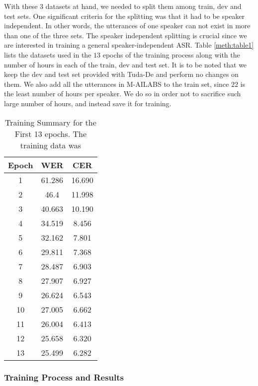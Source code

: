 With these $3$ datasets at hand, we needed to split them among train, dev and test sets. One significant criteria for the splitting was that it had to be speaker independent. In other words, the utterances of one speaker can not exist in more than one of the three sets. The speaker independent splitting is crucial since we are interested in training a general speaker-independent \ac{ASR}. Table \ref{meth:table1} lists the datasets used in the $13$ epochs of the training process along with the number of hours in each of the train, dev and test set. It is to be noted that we keep the dev and test set provided with Tuda-De and perform no changes on them. We also add all the utterances in M-AILABS to the train set, since $22$ is the least number of hours per speaker. We do so in order not to sacrifice such large number of hours, and instead save it for training.

\begin{table}[!ht]
	\centering
	\begin{tabular}{|c|c|c|}
		\hline
		Epoch & WER    & CER    \\ \hline
		1     & 61.286 & 16.690 \\ \hline
		2     & 46.4 & 11.998 \\ \hline
		3     & 40.663 & 10.190 \\ \hline
		4     & 34.519 & 8.456  \\ \hline
		5     & 32.162 & 7.801  \\ \hline
		6     & 29.811 & 7.368  \\ \hline
		7     & 28.487 & 6.903  \\ \hline
		8     & 27.907 & 6.927  \\ \hline
		9     & 26.624 & 6.543  \\ \hline
		10    & 27.005 & 6.662  \\ \hline
		11    & 26.004 & 6.413  \\ \hline
		12    & 25.658 & 6.320  \\ \hline
		13    & 25.499 & 6.282  \\ \hline
	\end{tabular}
	\caption{Training Summary for the First 13 epochs. The training data was }
	\label{meth:table2}
\end{table}


\subsubsection{Training Process and Results}
\label{meth:s4_sub3_subsub2}

